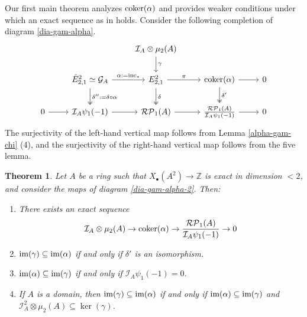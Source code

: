 \documentclass[11pt]{amsart}
\theoremstyle{definition}
\theoremstyle{plain}
\newtheorem{thm}[ntn]{Theorem}
\theoremstyle{definition}
\numberwithin{equation}{section}
\newcommand{\z}{\mathbb{Z}}
\newcommand{\GG}{\mathcal{G}}
\newcommand{\II}{\mathcal{I}}
\newcommand{\RP}{\mathcal{RP}}
\newcommand{\im}{{\rm im}}
\newcommand{\inc}{{\rm inc}}
\newcommand{\coker}{{\rm coker}}
\begin{document}
	Our first main theorem analyzes $\coker(\alpha)$ and provides weaker conditions under which an exact sequence as in \cite[Theorem 6.6]{B-E--2023} holds. Consider the following completion of diagram \eqref{dia-gam-alpha}.
	\begin{equation}\label{dia-gam-alpha-2}
		\begin{tikzcd}
			& & \II_A\otimes\mu_2(A)\ar[d,"\gamma"] & & \\
			& \hat{E}^2_{2,1}\simeq\GG_A \ar[r,"\alpha:=\inc_*"]\ar[d,twoheadrightarrow,"\delta'':=\delta\circ\alpha"] & E^2_{2,1} \ar[r,"\pi"]\ar[d,twoheadrightarrow,"\delta"] & \coker(\alpha)\ar[r]\ar[d,twoheadrightarrow,"\delta'"] & 0\\
			0 \ar[r] & \II_A\psi_1(-1)\ar[r] & \RP_1(A)\ar[r] & \frac{\RP_1(A)}{\II_A\psi_1(-1)}\ar[r] & 0
		\end{tikzcd}
	\end{equation}
	The surjectivity of the left-hand vertical map follows from Lemma \ref{alpha-gam-chi} (4), and the surjectivity of the right-hand vertical map follows from the five lemma.
	\begin{thm}\label{thm-main}
		Let $A$ be a ring such that $X_{\bullet}(A^2)\to\z$ is exact in dimension $<2$, and consider the maps of diagram \eqref{dia-gam-alpha-2}. Then:
		\begin{enumerate}
			\item There exists an exact sequence
			\[
			\II_A\otimes\mu_2(A)\to\coker(\alpha)\to\frac{\RP_1(A)}{\II_A\psi_1(-1)}\to 0
			\]
			\item $\im(\gamma)\subseteq\im(\alpha)$ if and only if $\delta'$ is an isomorphism.
			\item $\im(\alpha)\subseteq\im(\gamma)$ if and only if $\II_A\psi_1(-1)=0$.
			\item If $A$ is a domain, then $\im(\gamma)\subseteq\im(\alpha)$ if and only if $\im(\alpha)\subseteq\im(\gamma)$ and $\II_A^2\otimes\mu_2(A)\subseteq\ker(\gamma)$.
		\end{enumerate}
	\end{thm}
\end{document}
